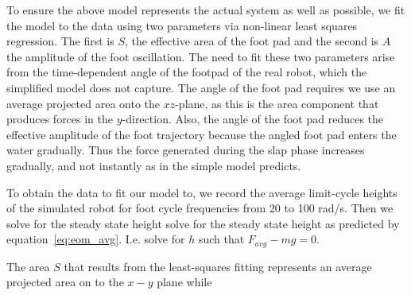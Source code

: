 To ensure the above model represents the actual system as well as possible, we fit the model to the data using two parameters via non-linear least squares regression. The first is $S$, the 
effective area of the foot pad and the second is $A$ the amplitude of the foot oscillation. The need to fit these two parameters arise from the time-dependent angle of the footpad of the real robot, which the simplified model does not capture. The angle of the foot pad requires we use an average projected area onto the $xz$-plane, as this is the area component that produces forces in the $y$-direction. Also, the angle of the foot pad reduces the effective amplitude of the foot trajectory because the angled foot pad enters the water gradually. Thus the force generated during the slap phase increases gradually, and not instantly as in the simple model predicts.

To obtain the data to fit our model to, we record the average limit-cycle heights of the simulated robot for foot cycle frequencies from 20 to 100 rad/s. Then we solve for the steady state height solve for the steady state height as predicted by equation~\ref{eq:eom_avg}. I.e. solve for $h$ such that $F_{avg} - mg = 0$.

The area $S$ that results from the least-squares fitting represents an average projected area on to the $x-y$ plane while 


